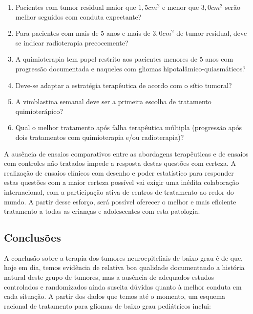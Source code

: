\documentclass[11pt,a4paper,oldfontcommands]{memoir}
\begin{document}
\begin{enumerate}
\item Pacientes com tumor residual maior que \(1,5 cm^2\) e menor que \(3,0 cm^2\) serão melhor seguidos com conduta expectante? 
\item Para pacientes com mais de 5 anos e mais de \(3,0 cm^2\) de tumor residual, deve-se indicar radioterapia precocemente? 
\item A quimioterapia tem papel restrito aos pacientes menores de 5 anos com progressão documentada e naqueles com gliomas hipotalâmico-quiasmáticos? 
\item Deve-se adaptar a estratégia terapêutica de acordo com o sítio tumoral?
\item A vimblastina semanal deve ser a primeira escolha de tratamento quimioterápico?
\item Qual o melhor tratamento após falha terapêutica múltipla (progressão após dois tratamentos com quimioterapia e/ou radioterapia)?
\end{enumerate}

A ausência de ensaios comparativos entre as abordagens terapêuticas e de ensaios com controles não tratados impede a resposta destas questões com certeza. A realização de ensaios clínicos com desenho e poder estatístico para responder estas questões com a maior certeza possível vai exigir uma inédita colaboração internacional, com a participação ativa de centros de tratamento ao redor do mundo. A partir desse esforço, será possível oferecer o melhor e mais eficiente tratamento a todas as crianças e adolescentes com esta patologia.

\subsection{Conclusões}

A conclusão sobre a terapia dos tumores neuroepiteliais de baixo grau é de que, hoje em dia, temos evidência de relativa boa qualidade documentando a história natural deste grupo de tumores, mas a ausência de adequados estudos controlados e randomizados ainda suscita dúvidas quanto à melhor conduta em cada situação. A partir dos dados que temos até o momento, um esquema racional de tratamento para gliomas de baixo grau pediátricos inclui:
\end{document}
